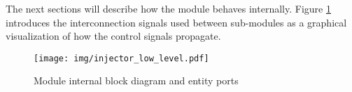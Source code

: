 The next sections will describe how the module behaves internally. Figure \ref{figure:low_level} introduces the interconnection signals used between sub-modules as a graphical visualization of how the control signals propagate.


\begin{figure}[H]
  \centering
  \texttt{[image: img/injector\_low\_level.pdf]}
  \caption{Module internal block diagram and entity ports}
  \label{figure:low_level}
\end{figure}


